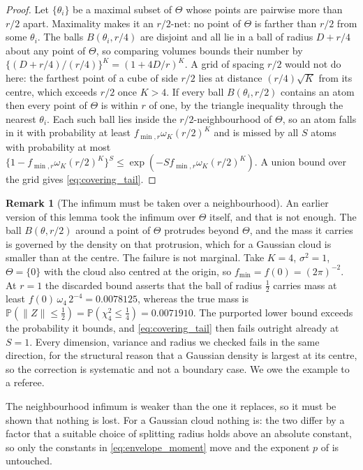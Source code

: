 \documentclass[11pt]{article}
\theoremstyle{definition}
\newtheorem{remark}[remark]{Remark}
\newcommand{\Pp}{\mathbb{P}}
\begin{document}
\begin{proof}
Let $\{\theta_i\}$ be a maximal subset of $\Theta$ whose points are pairwise more than $r/2$ apart. Maximality makes it an $r/2$-net: no point of $\Theta$ is farther than $r/2$ from some $\theta_i$. The balls $B(\theta_i,r/4)$ are disjoint and all lie in a ball of radius $D+r/4$ about any point of $\Theta$, so comparing volumes bounds their number by $\{(D+r/4)/(r/4)\}^K=(1+4D/r)^K$. A grid of spacing $r/2$ would not do here: the farthest point of a cube of side $r/2$ lies at distance $(r/4)\sqrt K$ from its centre, which exceeds $r/2$ once $K>4$. If every ball $B(\theta_i,r/2)$ contains an atom then every point of $\Theta$ is within $r$ of one, by the triangle inequality through the nearest $\theta_i$. Each such ball lies inside the $r/2$-neighbourhood of $\Theta$, so an atom falls in it with probability at least $f_{\min,r}\omega_K(r/2)^K$ and is missed by all $S$ atoms with probability at most $\{1-f_{\min,r}\omega_K(r/2)^K\}^S\le\exp(-Sf_{\min,r}\omega_K(r/2)^K)$. A union bound over the grid gives \eqref{eq:covering_tail}.
\end{proof}

\begin{remark}[The infimum must be taken over a neighbourhood]\label{rem:covering_neighbourhood}
An earlier version of this lemma took the infimum over $\Theta$ itself, and that is not enough. The ball $B(\theta,r/2)$ around a point of $\Theta$ protrudes beyond $\Theta$, and the mass it carries is governed by the density on that protrusion, which for a Gaussian cloud is smaller than at the centre. The failure is not marginal. Take $K=4$, $\sigma^2=1$, $\Theta=\{0\}$ with the cloud also centred at the origin, so $f_{\min}=f(0)=(2\pi)^{-2}$. At $r=1$ the discarded bound asserts that the ball of radius $\tfrac12$ carries mass at least $f(0)\,\omega_4\,2^{-4}=0.0078125$, whereas the true mass is $\Pp(\lVert Z\rVert\le\tfrac12)=\Pp(\chi^2_4\le\tfrac14)=0.0071910$. The purported lower bound exceeds the probability it bounds, and \eqref{eq:covering_tail} then fails outright already at $S=1$. Every dimension, variance and radius we checked fails in the same direction, for the structural reason that a Gaussian density is largest at its centre, so the correction is systematic and not a boundary case. We owe the example to a referee.
\end{remark}

The neighbourhood infimum is weaker than the one it replaces, so it must be shown that nothing is lost. For a Gaussian cloud nothing is: the two differ by a factor that a suitable choice of splitting radius holds above an absolute constant, so only the constants in \eqref{eq:envelope_moment} move and the exponent $p$ of  is untouched.
\end{document}
